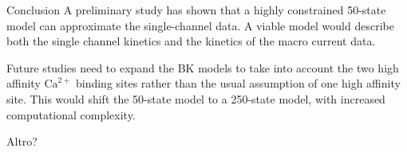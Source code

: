 \documentclass{beamer}
\newcommand{\ca}{\text{Ca}^{2+}}
\begin{document}
\begin{frame}{Conclusion}
A preliminary study has shown that a highly constrained 50-state model can approximate the single-channel data.
A viable model would describe both the single channel kinetics and the kinetics of the macro current data.

Future studies need to expand the BK models to take into account the two high affinity $\ca$ binding sites rather than the usual assumption of one high affinity site.
This would shift the 50-state model to a 250-state model, with increased computational complexity.
\end{frame}

\begin{frame}{Altro?}

\end{frame}
\end{document}
